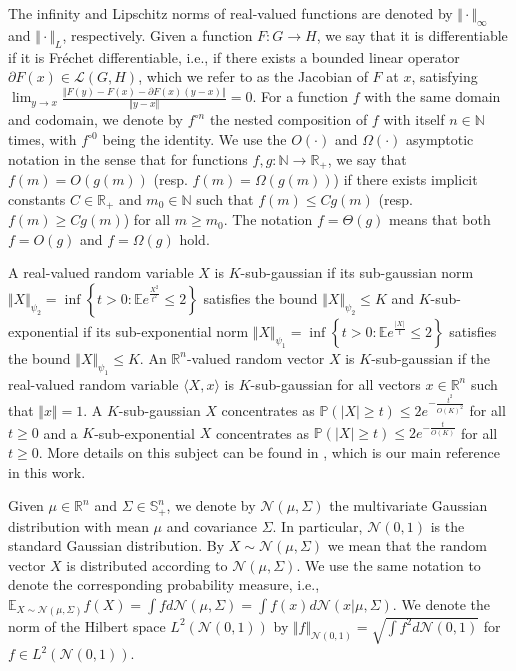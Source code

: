 \documentclass[twoside,11pt]{article}
\newcommand{\R}{\mathbb{R}}
\newcommand{\N}{\mathbb{N}}
\newcommand{\E}{\mathbb{E}}
\newcommand{\Ell}{\mathcal{L}}
\newcommand{\Prob}{\mathbb{P}}
\begin{document}
The infinity and Lipschitz norms of real-valued functions are denoted by $\Vert \cdot \Vert_\infty$ and $\Vert \cdot \Vert_L$, respectively. Given a function $F:G \to H$, we say that it is differentiable if it is Fr\'echet differentiable, i.e., if there exists a bounded linear operator $\partial F(x) \in \Ell(G,H)$, which we refer to as the Jacobian of $F$ at $x$, satisfying $\lim_{y \to x }\frac{\Vert F(y) - F(x) - \partial F(x) (y - x) \Vert}{\Vert y - x \Vert}=0$. For a function $f$ with the same domain and codomain, we denote by $f^{\circ n}$ the nested composition of $f$ with itself $n \in \N$ times, with $f^{\circ 0}$ being the identity. We use the $O(\cdot)$ and $\Omega(\cdot)$ asymptotic notation in the sense that for functions $f,g : \N \to \R_+$, we say that $f(m) = O(g(m))$ (resp. $f(m) = \Omega(g(m))$) if there exists implicit constants $C \in \R_+$ and $m_0 \in \N$ such that $f(m) \leq C g(m)$ (resp. $f(m) \geq C g(m)$) for all $m \geq m_0$. The notation $f = \Theta(g)$ means that both $f=O(g)$ and $f=\Omega(g)$ hold.

A real-valued random variable $X$ is $K$-sub-gaussian if its sub-gaussian norm $\Vert X \Vert_{\psi_2} = \inf\left\{ t > 0 : \E e^{\frac{X^2}{t^2}} \leq 2 \right\}$ satisfies the bound $\Vert X \Vert_{\psi_2} \leq K$ and $K$-sub-exponential if its sub-exponential norm $\Vert X \Vert_{\psi_1} = \inf\left\{ t > 0 : \E e^{\frac{\vert X \vert}{t}} \leq 2 \right\}$ satisfies the bound $\Vert X \Vert_{\psi_1} \leq K$. An $\R^n$-valued random vector $X$ is $K$-sub-gaussian if the real-valued random variable $\langle X, x \rangle$ is $K$-sub-gaussian for all vectors $x \in \R^n$ such that $\Vert x \Vert=1$. A $K$-sub-gaussian $X$ concentrates as $\Prob(\vert X \vert \geq t) \leq 2e^{-\frac{t^2}{O(K)^2}}$ for all $t \geq 0$ and a $K$-sub-exponential $X$ concentrates as $\Prob(\vert X \vert \geq t) \leq 2e^{-\frac{t}{O(K)}}$ for all $t \geq 0$. More details on this subject can be found in \citet{Vershynin2018}, which is our main reference in this work.

Given $\mu \in \R^n$ and $\Sigma \in \mathbb{S}^n_+$, we denote by $\mathcal{N}(\mu,\Sigma)$ the multivariate Gaussian distribution with mean $\mu$ and covariance $\Sigma$. In particular, $\mathcal{N}(0,1)$ is the standard Gaussian distribution. By $X \sim \mathcal{N}(\mu,\Sigma)$ we mean that the random vector $X$ is distributed according to $\mathcal{N}(\mu,\Sigma)$. We use the same notation to denote the corresponding probability measure, i.e., $\E_{X \sim \mathcal{N}(\mu,\Sigma)} f(X) = \int f d\mathcal{N}(\mu,\Sigma) = \int f(x) d\mathcal{N}(x \vert \mu,\Sigma)$. We denote the norm of the Hilbert space $L^2(\mathcal{N}(0,1))$ by $\Vert f \Vert_{\mathcal{N}(0,1)} = \sqrt{\int f^2 d\mathcal{N}(0,1)}$ for $f \in L^2(\mathcal{N}(0,1))$.
\end{document}
